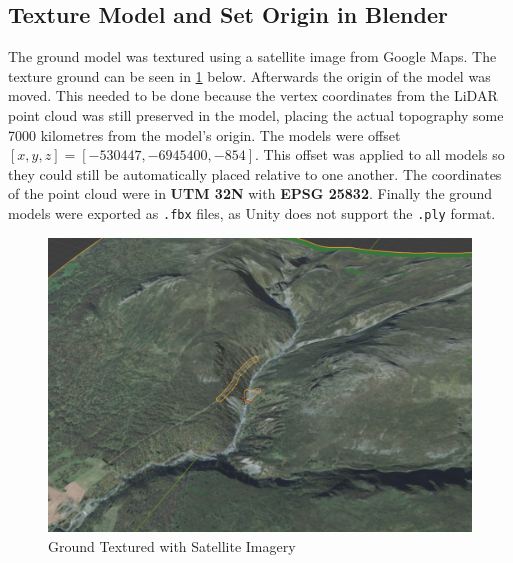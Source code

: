    \subsection{Texture Model and Set Origin in Blender}
        The ground model was textured using a satellite image from Google Maps. The texture ground can be seen in \cref{fig:ground_textured} below. Afterwards the origin of the model was moved. This needed to be done because the vertex coordinates from the LiDAR point cloud was still preserved in the model, placing the actual topography some 7000 kilometres from the model's origin. The models were offset $[x, y, z] = [-530447, -6945400, -854]$. This offset was applied to all models so they could still be automatically placed relative to one another. The coordinates of the point cloud were in \textbf{UTM 32N} with \textbf{EPSG 25832}. Finally the ground models were exported as \texttt{.fbx} files, as Unity does not support the \texttt{.ply} format.
        
        \FloatBarrier
        \begin{figure}
            \centering
            \includegraphics[width=\ImageWidth]{figures/ground_textured.PNG}
            \caption{Ground Textured with Satellite Imagery}
            \label{fig:ground_textured}
        \end{figure}
        \FloatBarrier
        
